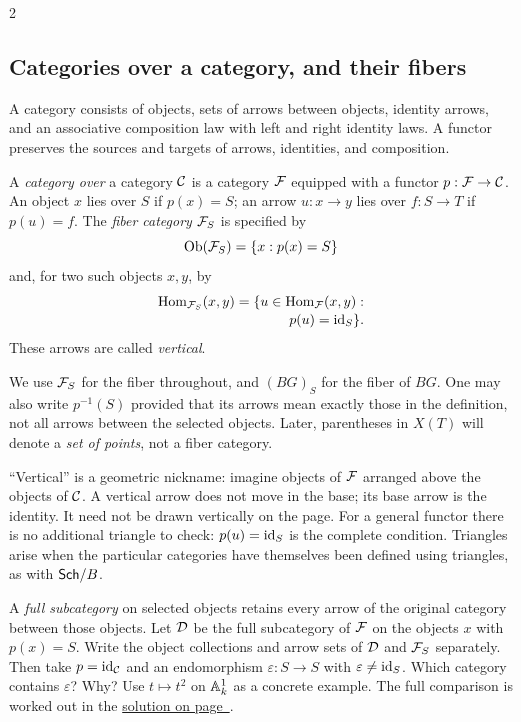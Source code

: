 \documentclass[12pt]{memoir}
\begin{document}
\begin{multicols}{2}
\subsection{Categories over a category, and their fibers}
\begin{Def}
A category consists of objects, sets of arrows between objects, identity
arrows, and an associative composition law with left and right identity
laws. A functor preserves the sources and targets of arrows, identities,
and composition.
\end{Def}

\begin{Def}
A \emph{category over} a category $\mathcal{C}$ is a category $\mathcal{F}$ equipped with a
functor $p:\mathcal{F}\to\mathcal{C}$. An object $x$ lies over $S$ if $p(x)=S$;
an arrow $u:x\to y$ lies over $f:S\to T$ if $p(u)=f$.
The \emph{fiber category} $\mathcal{F}_S$ is specified by
\[
 \operatorname{Ob}(\mathcal{F}_S)=\{x:p(x)=S\}
\]
and, for two such objects $x,y$, by
\[
\begin{aligned}
\Hom_{\cF_S}(x,y)
=\{u\in\Hom_{\cF}(x,y):\\[-0.4ex]
\hfill p(u)=\id_S\}.
\end{aligned}
\]
These arrows are called \emph{vertical}.
\end{Def}

We use $\mathcal{F}_S$ for the fiber throughout, and $(BG)_S$ for the fiber
of $BG$. One may also write $p^{-1}(S)$ provided that its arrows mean
exactly those in the definition, not all arrows between the selected
objects. Later, parentheses in $X(T)$ will denote a \emph{set of points},
not a fiber category.

\begin{Rmk}
``Vertical'' is a geometric nickname: imagine objects of $\mathcal{F}$ arranged
above the objects of $\mathcal{C}$. A vertical arrow does not move in the base;
its base arrow is the identity. It need not be drawn vertically on the
page. For a general functor there is no additional triangle to check:
$p(u)=\operatorname{id}_S$ is the complete condition. Triangles arise when the
particular categories have themselves been defined using triangles,
as with $\mathsf{Sch}/B$.
\end{Rmk}

\begin{Ej}\label{ex:fiber}
A \emph{full subcategory} on selected objects retains every arrow of
the original category between those objects. Let $\mathcal{D}$ be the full
subcategory of $\mathcal{F}$ on the objects $x$ with $p(x)=S$.
Write the object collections and arrow sets of $\mathcal{D}$ and $\mathcal{F}_S$
separately. Then take $p=\operatorname{id}_{\mathcal{C}}$ and an endomorphism
$\varepsilon:S\to S$ with $\varepsilon\ne\operatorname{id}_S$.
Which category contains $\varepsilon$? Why? Use $t\mapsto t^2$ on
$\mathbb{A}^1_k$ as a concrete example. The full comparison is worked out in
the \hyperref[sol:ex:fiber]{solution on page~\pageref*{sol:ex:fiber}}.
\end{Ej}


\end{multicols}
\end{document}
